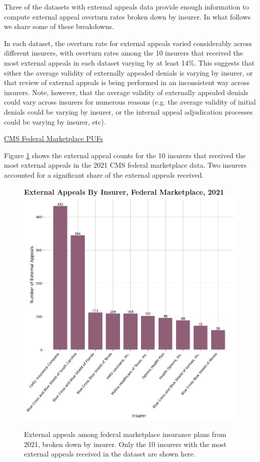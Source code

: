 \documentclass[12pt, a4paper,twoside]{report}
\theoremstyle{plain} %
\theoremstyle{definition} %
\theoremstyle{remark} %
\numberwithin{equation}{chapter}
\begin{document}
		Three of the datasets with external appeals data provide enough information to compute external appeal overturn rates broken down by insurer. In what follows we share some of these breakdowns.
		
		In each dataset, the overturn rate for external appeals varied considerably across different insurers, with overturn rates among the 10 insurers that received the most external appeals in each dataset varying by at least 14\%. This suggests that either the average validity of externally appealed denials is varying by insurer, or that review of external appeals is being performed in an inconsistent way across insurers. Note, however, that the average validity of externally appealed denials could vary across insurers for numerous reasons (e.g. the average validity of initial denials could be varying by insurer, or the internal appeal adjudication processes could be varying by insurer, etc).
		
		\underline{CMS Federal Marketplace PUFs}
		
		Figure \ref{federalexternalbyinsurer} shows the external appeal counts for the 10 insurers that received the most external appeals in the 2021 CMS federal marketplace data. Two insurers accounted for a significant share of the external appeals received.
		
		
		\begin{figure}[h!]
			\centering
			\textbf{External Appeals By Insurer, Federal Marketplace, 2021}
			\includegraphics[width=.8\textwidth]{images/cms_puf/external_appeals_top_insurers.png}
			\caption{External appeals among federal marketplace insurance plans from 2021, broken down by insurer. Only the 10 insurers with the most external appeals received in the dataset are shown here.}
			\label{federalexternalbyinsurer}
		\end{figure}
	
\end{document}
